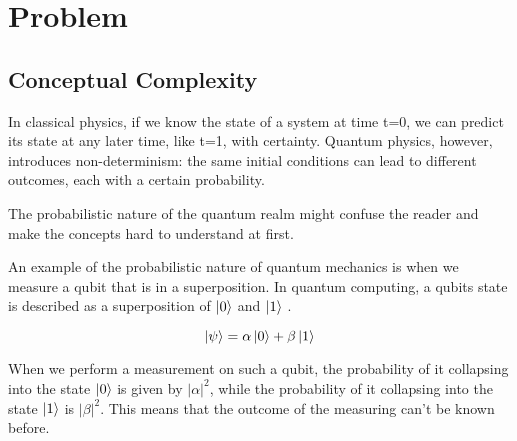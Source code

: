 

\section{Problem}


\subsection{Conceptual Complexity}
In classical physics, if we know the state of a system at time t=0, we can predict its state at any later time, like t=1, with certainty. Quantum physics, however, introduces non-determinism: the same initial conditions can lead to different outcomes, each with a certain probability.

The probabilistic nature of the quantum realm might confuse the reader and make the concepts hard to understand at first.

An example of the probabilistic nature of quantum mechanics is when we measure a qubit that is in a superposition. In quantum computing, a qubits state is described as a superposition of $\ket{0}$ and $\ket{1}$ \cite{niel_chang}.

$$ \ket{\psi} = \alpha  \ket{0} + \beta \ket{1}$$

When we perform a measurement on such a qubit, the probability of it collapsing into the state $\ket{0}$ is given by $|\alpha|^2$, while the probability of it collapsing into the state $\ket{1}$ is $|\beta|^2$. This means that the outcome of the measuring can't be known before.

